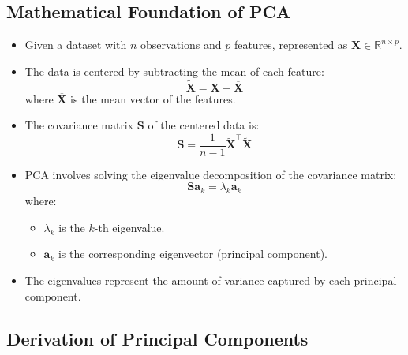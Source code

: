 \documentclass{article}
\begin{document}
\subsection{Mathematical Foundation of PCA}

\begin{itemize}
    \item Given a dataset with $n$ observations and $p$ features, represented as $\mathbf{X} \in \mathbb{R}^{n \times p}$.
    \item The data is centered by subtracting the mean of each feature:
    \[
    \tilde{\mathbf{X}} = \mathbf{X} - \overline{\mathbf{X}}
    \]
    where $\overline{\mathbf{X}}$ is the mean vector of the features.
    \item The covariance matrix $\mathbf{S}$ of the centered data is:
    \[
    \mathbf{S} = \frac{1}{n-1} \tilde{\mathbf{X}}^\top \tilde{\mathbf{X}}
    \]
    \item PCA involves solving the eigenvalue decomposition of the covariance matrix:
    \[
    \mathbf{S} \mathbf{a}_k = \lambda_k \mathbf{a}_k
    \]
    where:
    \begin{itemize}
        \item $\lambda_k$ is the $k$-th eigenvalue.
        \item $\mathbf{a}_k$ is the corresponding eigenvector (principal component).
    \end{itemize}
    \item The eigenvalues represent the amount of variance captured by each principal component.
\end{itemize}

\subsection{Derivation of Principal Components}
\end{document}
